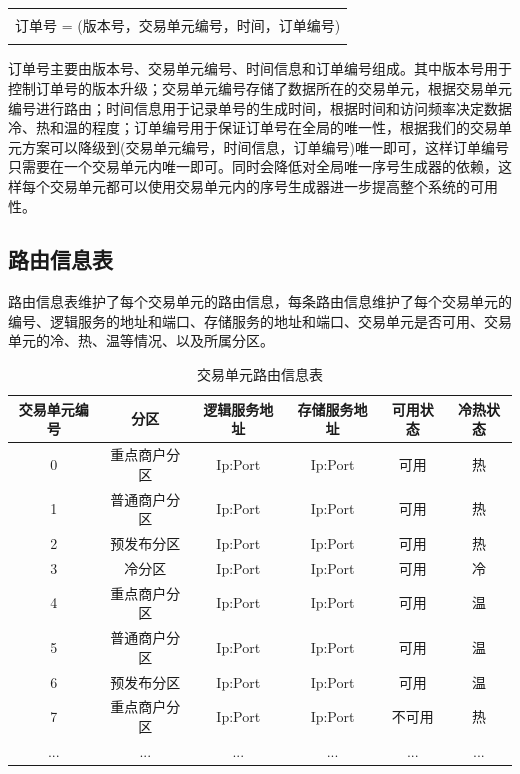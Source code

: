 \documentclass[letterpaper,twocolumn,10pt]{article}
\begin{document}
\begin{table}[htp]
\begin{center}
\begin{tabular}{c}
\hline
\hline
\\
订单号 = (版本号，交易单元编号，时间，订单编号) \\
\\
\hline
\hline
\end{tabular}
\end{center}
\label{default}
\end{table}%

订单号主要由版本号、交易单元编号、时间信息和订单编号组成。其中版本号用于控制订单号的版本升级；交易单元编号存储了数据所在的交易单元，根据交易单元编号进行路由；时间信息用于记录单号的生成时间，根据时间和访问频率决定数据冷、热和温的程度；订单编号用于保证订单号在全局的唯一性，根据我们的交易单元方案可以降级到(交易单元编号，时间信息，订单编号)唯一即可，这样订单编号只需要在一个交易单元内唯一即可。同时会降低对全局唯一序号生成器的依赖，这样每个交易单元都可以使用交易单元内的序号生成器进一步提高整个系统的可用性。

\subsection{路由信息表}
路由信息表维护了每个交易单元的路由信息，每条路由信息维护了每个交易单元的编号、逻辑服务的地址和端口、存储服务的地址和端口、交易单元是否可用、交易单元的冷、热、温等情况、以及所属分区。
\begin{table}[htp]
\caption{交易单元路由信息表}
\begin{center}
\begin{tabular}{|c|c|c|c|c|c|}
\hline
交易单元编号 & 分区 & 逻辑服务地址 & 存储服务地址 & 可用状态 & 冷热状态 \\
\hline
\hline
0 & 重点商户分区 & Ip:Port  &  Ip:Port  & 可用 & 热 \\
\hline
1 & 普通商户分区 & Ip:Port  &  Ip:Port & 可用 & 热 \\
\hline
2 & 预发布分区 & Ip:Port  &  Ip:Port & 可用 & 热 \\
\hline
3 & 冷分区 & Ip:Port  &  Ip:Port & 可用 & 冷 \\
\hline
4 & 重点商户分区 & Ip:Port  &  Ip:Port  & 可用 & 温 \\
\hline
5 & 普通商户分区 & Ip:Port  &  Ip:Port & 可用 & 温 \\
\hline
6 & 预发布分区 & Ip:Port  &  Ip:Port & 可用 & 温 \\
\hline
7 & 重点商户分区 & Ip:Port  &  Ip:Port  & 不可用 & 热 \\
\hline
... & ... & ... & ... & ... & ... \\
\hline
\end{tabular}
\end{center}
\label{route}
\end{table}%
\end{document}
